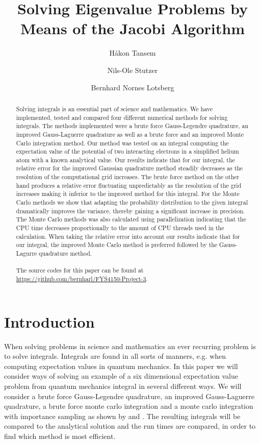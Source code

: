 \documentclass[10pt, twocolumn]{aastex62}
\begin{document}
\title{Solving Eigenvalue Problems by Means of the Jacobi Algorithm}

\author{Håkon Tansem}

\author{Nils-Ole Stutzer}

\author{Bernhard Nornes Lotsberg}

\begin{abstract}
	Solving integrals is an essential part of science and mathematics. We have
	implemented, tested and compared four different numerical methods for
	solving integrals. The methods implemented were a brute force
	Gauss-Legendre quadrature, an improved Gauss-Laguerre quadrature as well as
	a brute force and an improved Monte Carlo integration method. Our method was
	tested on an integral computing the expectation value of the potential of
	two interacting electrons in a simplified helium atom with a known
	analytical value. Our results indicate that for our integral, the relative error for the improved Gaussian
	quadrature method steadily decreases as the resolution of the computational
	grid increases. The brute force method on the other hand produces a relative
	error fluctuating unpredictably as the resolution of the grid increases
	making it inferior to the improved method for this integral. For the Monte
	Carlo methods we show that adapting the probability distribution to the
	given integral dramatically improves the variance, thereby gaining a
	significant increase in precision. The Monte Carlo methods was also
	calculated using parallelization indicating that the CPU time decreases
	proportionally to the amount of CPU threads used in the calculation. When
	taking the relative error into account our results indicate that for our
	integral, the improved Monte Carlo method is preferred followed by the
	Gauss-Lagurre quadrature method. \\\\
	The source codes for this paper can be found at
	\href{https://github.com/bernharl/FYS4150-Project-3}{https://github.com/bernharl/FYS4150-Project-3}.  
	 
\end{abstract}

\section{Introduction} \label{sec:intro}
When solving problems in science and mathematics an ever recurring problem is to
solve integrals. Integrals are found in all sorts of manners, e.g. when
computing expectation values in quantum mechanics. In this paper we will
consider ways of solving an example of a six dimensional expectation value
problem from quantum mechanics integral in several different ways. We will
consider a brute force Gauss-Legendre quadrature, an improved Gauss-Laguerre
quadrature, a brute force monte carlo integration and a monte carlo integration
with importance sampling as shown by \cite{press:2007} and \cite{jensen:2015}.
The resulting integrals will be compared to the analytical solution and the run
times are compared, in order to find which method is most efficient.
\end{document}
